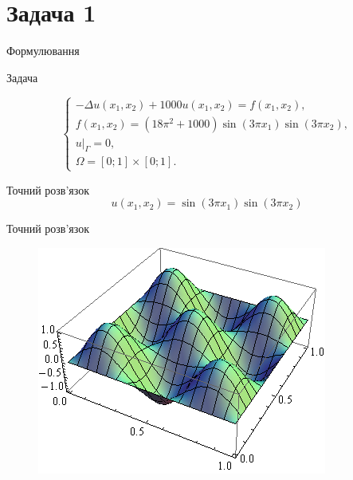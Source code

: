
\section{Задача 1}
\frame{\sectionpage}
\begin{frame}{Формулювання}

		Задача

		\begin{equation}\label{eq:problem1}
		\begin{cases}
			- \Delta u(x_1,x_2) + 1000u(x_1, x_2) = f(x_1,x_2), \\
			f(x_1,x_2) = (18 \pi^2 +1000)\sin(3 \pi x_1) \sin (3 \pi x_2), \\
			u|_\Gamma = 0 ,\\
			\Omega = \left[0;1\right] \times \left[0;1\right].
		\end{cases}
		\end{equation}

		Точний розв'язок
		\begin{equation}
			u(x_1,x_2) = \sin(3 \pi x_1) \sin (3 \pi x_2)
		\end{equation}

\end{frame}

\begin{frame}{Точний розв'язок}
		\begin{figure}[H]
			\centering
		    \includegraphics[scale=0.6]{problem1/ExactSolution}
		    \label{plot:problem1_exact}
		\end{figure}
\end{frame}

